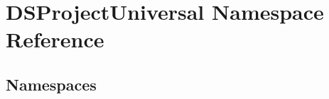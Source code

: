 \section{D\+S\+Project\+Universal Namespace Reference}
\label{namespace_d_s_project_universal}
\subsection*{Namespaces}
\begin{DoxyCompactItemize}
\end{DoxyCompactItemize}
